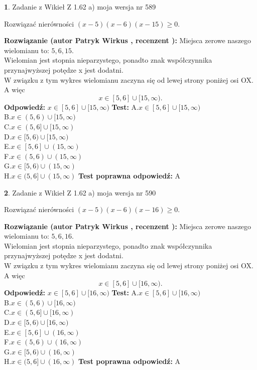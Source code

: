 \documentclass[12pt, a4paper]{article}
\theoremstyle{definition} %
\newtheorem{zad}{}
\newcommand{\zadStart}[1]{\begin{zad}#1\newline}
\newcommand{\zadStop}{\end{zad}}
\newcommand{\rozwStart}[2]{\noindent \textbf{Rozwiązanie (autor #1 , recenzent #2): }\newline}
\newcommand{\rozwStop}{\newline}
\newcommand{\odpStart}{\noindent \textbf{Odpowiedź:}\newline}
\newcommand{\odpStop}{\newline}
\newcommand{\testStart}{\noindent \textbf{Test:}\newline}
\newcommand{\testStop}{\newline}
\newcommand{\kluczStart}{\noindent \textbf{Test poprawna odpowiedź:}\newline}
\newcommand{\kluczStop}{\newline}
\begin{document}
\zadStart{Zadanie z Wikieł Z 1.62 a) moja wersja nr 589}

Rozwiązać nierówności $(x-5)(x-6)(x-15)\ge0$.
\zadStop
\rozwStart{Patryk Wirkus}{}
Miejsca zerowe naszego wielomianu to: $5, 6, 15$.\\
Wielomian jest stopnia nieparzystego, ponadto znak współczynnika przy\linebreak najwyższej potędze x jest dodatni.\\ W związku z tym wykres wielomianu zaczyna się od lewej strony poniżej osi OX. A więc $$x \in [5,6] \cup [15,\infty).$$
\rozwStop
\odpStart
$x \in [5,6] \cup [15,\infty)$
\odpStop
\testStart
A.$x \in [5,6] \cup [15,\infty)$\\
B.$x \in (5,6) \cup [15,\infty)$\\
C.$x \in (5,6] \cup [15,\infty)$\\
D.$x \in [5,6) \cup [15,\infty)$\\
E.$x \in [5,6] \cup (15,\infty)$\\
F.$x \in (5,6) \cup (15,\infty)$\\
G.$x \in [5,6) \cup (15,\infty)$\\
H.$x \in (5,6] \cup (15,\infty)$
\testStop
\kluczStart
A
\kluczStop



\zadStart{Zadanie z Wikieł Z 1.62 a) moja wersja nr 590}

Rozwiązać nierówności $(x-5)(x-6)(x-16)\ge0$.
\zadStop
\rozwStart{Patryk Wirkus}{}
Miejsca zerowe naszego wielomianu to: $5, 6, 16$.\\
Wielomian jest stopnia nieparzystego, ponadto znak współczynnika przy\linebreak najwyższej potędze x jest dodatni.\\ W związku z tym wykres wielomianu zaczyna się od lewej strony poniżej osi OX. A więc $$x \in [5,6] \cup [16,\infty).$$
\rozwStop
\odpStart
$x \in [5,6] \cup [16,\infty)$
\odpStop
\testStart
A.$x \in [5,6] \cup [16,\infty)$\\
B.$x \in (5,6) \cup [16,\infty)$\\
C.$x \in (5,6] \cup [16,\infty)$\\
D.$x \in [5,6) \cup [16,\infty)$\\
E.$x \in [5,6] \cup (16,\infty)$\\
F.$x \in (5,6) \cup (16,\infty)$\\
G.$x \in [5,6) \cup (16,\infty)$\\
H.$x \in (5,6] \cup (16,\infty)$
\testStop
\kluczStart
A
\kluczStop
\end{document}
